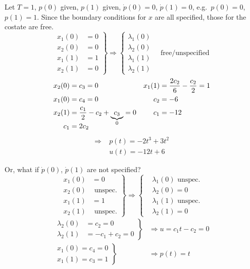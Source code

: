 Let $T=1$, $p(0)$ given, $p(1)$ given, $\dot p(0)=0$, $\dot p(1)=0$, e.g.\ $p(0)=0$, $p(1)=1$. Since the boundary conditions for $x$ are all specified, those for the costate are free.
\[
  \left.
    \begin{aligned}
      x_1(0) &= 0 \\
      x_2(0) &= 0 \\
      x_1(1) &= 1 \\
      x_2(1) &= 0
    \end{aligned} \right\}
  \Longrightarrow
  \left\{
    \begin{aligned}
      \lambda_1(0) \\
      \lambda_2(0) \\
      \lambda_1(1) \\
      \lambda_2(1)
    \end{aligned} \right.
  \quad \text{free/unspecified}
\]
\begin{alignat}{2}
  x_2(0) &= c_3 = 0 & x_1(1) &= \frac{2c_2}{6} - \frac{c_2}{2} = 1 \\
  x_1(0) &= c_4 = 0 & c_2 &= -6 \\
  x_2(1) &= \frac{c_1}{2} - c_2 + \smash{ \underbrace{c_3}_{0} } = 0 & c_1 &= -12 \\
  c_1 &= 2c_2
\end{alignat}
\begin{align}
  \Longrightarrow \; & p(t) = -2t^3 + 3t^2 \\
                     & u(t) = -12t + 6
\end{align}

Or, what if $\dot p(0)$, $\dot p(1)$ are not specified?
\[
  \left.
    \begin{aligned}
      x_1(0) &= 0 \\
      x_2(0) & \text{ unspec.} \\
      x_1(1) &= 1 \\
      x_2(1) & \text{ unspec.}
    \end{aligned} \right\}
  \Longrightarrow
  \left\{
    \begin{aligned}
      & \lambda_1(0) \text{ unspec.} \\
      & \lambda_2(0) = 0 \\
      & \lambda_1(1) \text{ unspec.} \\
      & \lambda_2(1) = 0
    \end{aligned} \right.
\]
\begin{align}
  \left.
  \begin{aligned}
    \lambda_2(0) &= c_2 = 0 \\
    \lambda_2(1) &= -c_1 + c_2 = 0
  \end{aligned}
                   \right\} & \Longrightarrow
                              u = c_1t- c_2 = 0 \\
  \left.
  \begin{aligned}
    x_1(0) = c_4 = 0 \\
    x_1(1) = c_3 = 1
  \end{aligned}
  \right\} & \Longrightarrow
             p(t) = t
\end{align}

